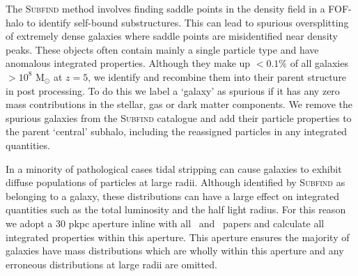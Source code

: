 The \textsc{Subfind} method involves finding saddle points in the density field in a FOF-halo to identify self-bound substructures. This can lead to spurious oversplitting of extremely dense galaxies where saddle points are misidentified near density peaks. These objects often contain mainly a single particle type and have anomalous integrated properties. Although they make up $<0.1\%$ of all galaxies $>10^8$ M$_\odot$ at $z=5$, we identify and recombine them into their parent structure in post processing. To do this we label a `galaxy' as spurious if it has any zero mass contributions in the stellar, gas or dark matter components. We remove the spurious galaxies from the \textsc{Subfind} catalogue and add their particle properties to the parent `central' subhalo, including the reassigned particles in any integrated quantities. 

In a minority of pathological cases tidal stripping can cause galaxies to exhibit diffuse populations of particles at large radii. Although identified by \textsc{Subfind} as belonging to a galaxy, these distributions can have a large effect on integrated quantities such as the total luminosity and the half light radius. For this reason we adopt a 30 pkpc aperture inline with all \eagle\ and \flares\ papers and calculate all integrated properties within this aperture. This aperture ensures the majority of galaxies have mass distributions which are wholly within this aperture and any erroneous distributions at large radii are omitted.